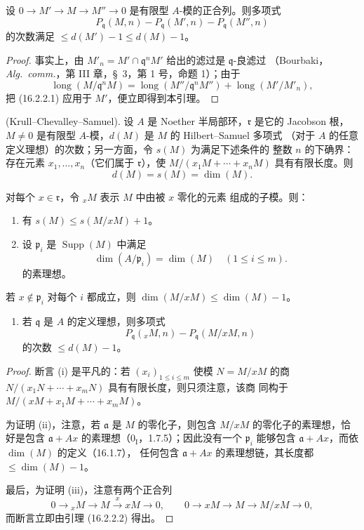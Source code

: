 \begin{lemma}[16.2.2.2]
\label{0.16.2.2.2-fr}
设 $0\to M'\to M\to M''\to0$ 是有限型 $A$-模的正合列。则多项式
\[
  P_{\mathfrak{q}}(M,n)-P_{\mathfrak{q}}(M',n)
  -P_{\mathfrak{q}}(M'',n)
\]
的次数满足 $\leq d(M')-1\leq d(M)-1$。
\end{lemma}

\begin{proof}
事实上，由
$M'_n=M'\cap\mathfrak{q}^nM'$ 给出的滤过是 $\mathfrak{q}$-良滤过
（Bourbaki，\emph{Alg.~comm.}，第 III 章，\S~3，第 1 号，命题 1）；由于
\[
  \operatorname{long}(M/\mathfrak{q}^nM)
  =\operatorname{long}(M''/\mathfrak{q}^nM'')
  +\operatorname{long}(M'/M'_n),
\]
把 (16.2.2.1) 应用于 $M'$，便立即得到本引理。
\end{proof}

\begin{theorem}[16.2.3]
\label{0.16.2.3-fr}
\textup{(Krull--Chevalley--Samuel).}
设 $A$ 是 Noether 半局部环，$\mathfrak{r}$ 是它的 Jacobson 根，
$M\neq0$ 是有限型 $A$-模，$d(M)$ 是 $M$ 的 Hilbert--Samuel 多项式
（对于 $A$ 的任意定义理想）的次数；另一方面，令 $s(M)$ 为满足下述条件的
整数 $n$ 的下确界：存在元素 $x_1,\ldots,x_n$（它们属于
$\mathfrak{r}$），使 $M/(x_1M+\cdots+x_nM)$ 具有有限长度。则
\[
  d(M)=s(M)=\dim(M).
\]
\end{theorem}

\begin{lemma}[16.2.3.1]
\label{0.16.2.3.1-fr}
对每个 $x\in\mathfrak{r}$，令 ${}_xM$ 表示 $M$ 中由被 $x$ 零化的元素
组成的子模。则：
\begin{enumerate}
  \item[\rm{(i)}] 有 $s(M)\leq s(M/xM)+1$。
  \item[\rm{(ii)}] 设 $\mathfrak{p}_i$ 是
  $\operatorname{Supp}(M)$ 中满足
  \[
    \dim(A/\mathfrak{p}_i)=\dim(M)\quad(1\leq i\leq m).
  \]
  的素理想。
\end{enumerate}
若 $x\notin\mathfrak{p}_i$ 对每个 $i$ 都成立，则
$\dim(M/xM)\leq\dim(M)-1$。
\begin{enumerate}
  \item[\rm{(iii)}] 若 $\mathfrak{q}$ 是 $A$ 的定义理想，则多项式
  \[
    P_{\mathfrak{q}}({}_xM,n)-P_{\mathfrak{q}}(M/xM,n)
  \]
  的次数 $\leq d(M)-1$。
\end{enumerate}
\end{lemma}

\begin{proof}
断言 (i) 是平凡的：若 $(x_i)_{1\leq i\leq m}$ 使模
$N=M/xM$ 的商 $N/(x_1N+\cdots+x_mN)$ 具有有限长度，则只须注意，该商
同构于 $M/(xM+x_1M+\cdots+x_mM)$。

为证明 (ii)，注意，若 $\mathfrak{a}$ 是 $M$ 的零化子，则包含
$M/xM$ 的零化子的素理想，恰好是包含 $\mathfrak{a}+Ax$
的素理想（$0_{\mathrm I}$，1.7.5）；因此没有一个 $\mathfrak{p}_i$
能够包含 $\mathfrak{a}+Ax$，而依 $\dim(M)$ 的定义（16.1.7），
任何包含 $\mathfrak{a}+Ax$ 的素理想链，其长度都
$\leq\dim(M)-1$。


最后，为证明 (iii)，注意有两个正合列
\[
  0\to{}_xM\to M\xrightarrow{x}xM\to0,\qquad
  0\to xM\to M\to M/xM\to0,
\]
而断言立即由引理 (16.2.2.2) 得出。
\end{proof}

